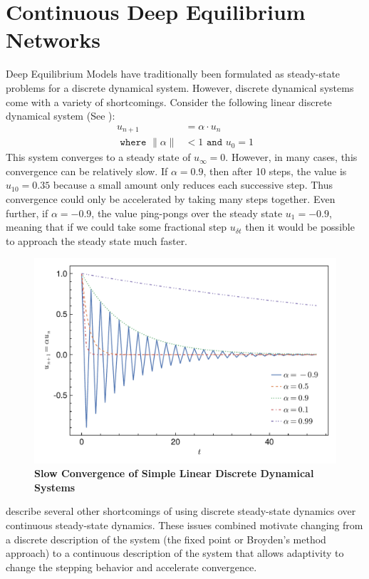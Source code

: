 \section{Continuous Deep Equilibrium Networks}
\label{sec:continuous_deqs}

Deep Equilibrium Models have traditionally been formulated as steady-state problems for a discrete dynamical system. However, discrete dynamical systems come with a variety of shortcomings. Consider the following linear discrete dynamical system (See ):
%
\begin{align}
    u_{n + 1}                   & = \alpha \cdot u_n         \\
    \texttt{ where } \|\alpha\| & < 1 \texttt{ and } u_0 = 1
\end{align}
%
This system converges to a steady state of $u_\infty = 0$. However, in many cases, this convergence can be relatively slow. If $\alpha = 0.9$, then after 10 steps, the value is $u_{10} = 0.35$ because a small amount only reduces each successive step. Thus convergence could only be accelerated by taking many steps together. Even further, if $\alpha = -0.9$, the value ping-pongs over the steady state $u_{1} = -0.9$, meaning that if we could take some fractional step $u_{\delta t}$ then it would be possible to approach the steady state much faster.

\begin{figure}[H]
    \centering
    \includegraphics[width=0.8\linewidth]{../figures/deep_equilibrium_models/linear_discrete_dynamical_system.pdf}
    \caption{\textbf{Slow Convergence of Simple Linear Discrete Dynamical Systems}}
    \label{fig:linear_discrete_dynamical_system}
\end{figure}

\citet{rico1992discrete, bulsari1995neural} describe several other shortcomings of using discrete steady-state dynamics over continuous steady-state dynamics. These issues combined motivate changing from a discrete description of the system (the fixed point or Broyden's method approach) to a continuous description of the system that allows adaptivity to change the stepping behavior and accelerate convergence.

